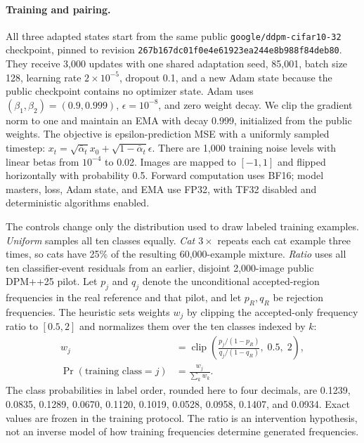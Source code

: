 \paragraph{Training and pairing.}
All three adapted states start from the same public
\texttt{google/ddpm-cifar10-32} checkpoint, pinned to revision
\texttt{267b167dc01f0e4e6192\allowbreak{}3ea244e8b988f84deb80}.
They receive 3,000 updates with one shared adaptation seed, 85,001,
batch size 128, learning rate $2\times10^{-5}$, dropout 0.1, and a new
Adam state because the public checkpoint contains no optimizer state.
Adam uses $(\beta_1,\beta_2)=(0.9,0.999)$, $\epsilon=10^{-8}$, and
zero weight decay. We clip the gradient norm to one and maintain an EMA
with decay 0.999, initialized from the public weights.
The objective is epsilon-prediction MSE with a uniformly sampled timestep:
$x_t=\sqrt{\bar\alpha_t}x_0+\sqrt{1-\bar\alpha_t}\epsilon$.
There are 1,000 training noise levels with linear betas from $10^{-4}$ to
0.02. Images are mapped to $[-1,1]$ and flipped horizontally with
probability 0.5. Forward computation uses BF16; model masters, loss,
Adam state, and EMA use FP32, with TF32 disabled and deterministic
algorithms enabled.

The controls change only the distribution used to draw labeled training
examples. \emph{Uniform} samples all ten classes equally.
\emph{Cat $3\times$} repeats each cat example three times, so cats have
25\% of the resulting 60,000-example mixture.
\emph{Ratio} uses all ten classifier-event residuals from an earlier,
disjoint 2,000-image public DPM++25 pilot. Let $p_j$ and $q_j$ denote the
unconditional accepted-region frequencies in the real reference and that
pilot, and let $p_R,q_R$ be rejection frequencies. The heuristic sets
weights $w_j$ by clipping the accepted-only frequency ratio to $[0.5,2]$
and normalizes them over the ten classes indexed by $k$:
\begin{equation}
\begin{aligned}
 w_j&=\operatorname{clip}\!\left(
 \frac{p_j/(1-p_R)}{q_j/(1-q_R)},\;0.5,\;2\right),\\
 \Pr(\text{training class}=j)&=\frac{w_j}{\sum_k w_k}.
\end{aligned}
\label{eq:supp_class_weighting}
\end{equation}
The class probabilities in label order, rounded here to four decimals, are
0.1239, 0.0835, 0.1289, 0.0670, 0.1120, 0.1019, 0.0528, 0.0958,
0.1407, and 0.0934. Exact values are frozen in the training protocol.
The ratio is an intervention hypothesis, not an inverse model of how
training frequencies determine generated frequencies.

